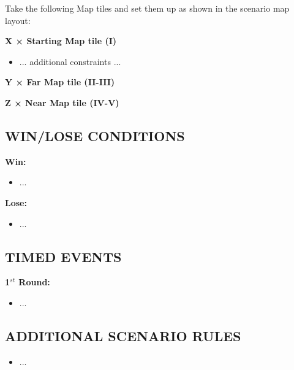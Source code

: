 \begin{multicols*}{2}
Take the following Map tiles and set them up as shown in the scenario map layout:

\textbf{X × Starting Map tile (I)}
\begin{itemize}
    \item ... additional constraints ...
\end{itemize}

\textbf{Y × Far Map tile (II-III)}

\textbf{Z × Near Map tile (IV-V)}

\subsection*{\MakeUppercase{Win/lose conditions}}

\textbf{Win:}
\begin{itemize}
    \item ...
\end{itemize}

\textbf{Lose:}
\begin{itemize}
    \item ...
\end{itemize}

\subsection*{\MakeUppercase{Timed events}}

\textbf{1$^{st}$ Round:}
\begin{itemize}
    \item ...
\end{itemize}

\end{multicols*}

\newpage

\subsection*{\MakeUppercase{Additional scenario rules}}

\begin{itemize}
    \item ...
\end{itemize}



